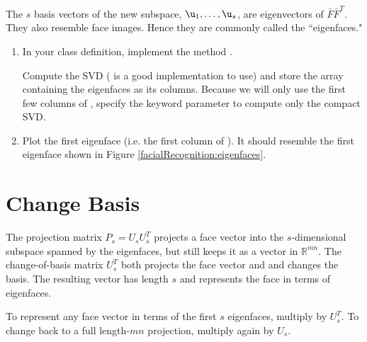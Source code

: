 The $s$ basis vectors of the new subspace, $\u_1, \ldots, \u_s$, are eigenvectors of $\bar{F}\bar{F}^T$.
They also resemble face images.
Hence they are commonly called the ``eigenfaces." 

\begin{problem}
\label{prob:svd}
\leavevmode
\begin{enumerate}
\item In your class definition, implement the method .

Compute the SVD ( is a good implementation to use) and store the array  containing the eigenfaces as its columns.
Because we will only use the first few columns of , specify the keyword parameter  to compute only the compact SVD.
\item Plot the first eigenface (i.e. the first column of ).
It should resemble the first eigenface shown in Figure \ref{facialRecognition:eigenfaces}.
\end{enumerate}
\end{problem}

\section*{Change Basis}

The projection matrix $P_s = U_s U_s^T$ projects a face vector into the $s$-dimensional subspace spanned by the eigenfaces, but still keeps it as a vector in $\mathbb{R}^{mn}$. 
The change-of-basis matrix $U_s^T$ both projects the face vector and and changes the basis.
The resulting vector has length $s$ and represents the face in terms of eigenfaces.

To represent any face vector in terms of the first $s$ eigenfaces, multiply by $U_s^T$. 
To change back to a full length-$mn$ projection, multiply again by $U_s$.

